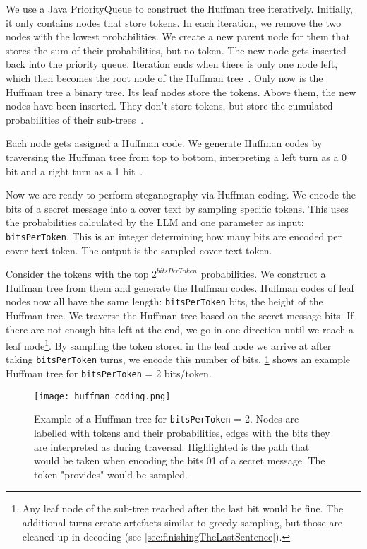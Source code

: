 We use a Java PriorityQueue to construct the Huffman tree iteratively. Initially, it only contains nodes that store tokens. In each iteration, we remove the two nodes with the lowest probabilities. We create a new parent node for them that stores the sum of their probabilities, but no token. The new node gets inserted back into the priority queue. Iteration ends when there is only one node left, which then becomes the root node of the Huffman tree~\cite{huffmanMethodConstructionMinimumRedundancy1952}. Only now is the Huffman tree a binary tree. Its leaf nodes store the tokens. Above them, the new nodes have been inserted. They don't store tokens, but store the cumulated probabilities of their sub-trees~\cite{huffmanMethodConstructionMinimumRedundancy1952}.

Each node gets assigned a Huffman code. We generate Huffman codes by traversing the Huffman tree from top to bottom, interpreting a left turn as a 0 bit and a right turn as a 1 bit~\cite{huffmanMethodConstructionMinimumRedundancy1952}.

Now we are ready to perform steganography via Huffman coding. We encode the bits of a secret message into a cover text by sampling specific tokens. This uses the probabilities calculated by the \gls{LLM} and one parameter as input: \lstinline|bitsPerToken|. This is an integer determining how many bits are encoded per cover text token. The output is the sampled cover text token.

Consider the tokens with the top $ 2^{bitsPerToken} $ probabilities. We construct a Huffman tree from them and generate the Huffman codes. Huffman codes of leaf nodes now all have the same length: \lstinline|bitsPerToken| bits, the height of the Huffman tree. We traverse the Huffman tree based on the secret message bits. If there are not enough bits left at the end, we go in one direction until we reach a leaf node\footnote{Any leaf node of the sub-tree reached after the last bit would be fine. The additional turns create artefacts similar to greedy sampling, but those are cleaned up in decoding (see \cref{sec:finishingTheLastSentence}).}. By sampling the token stored in the leaf node we arrive at after taking \lstinline|bitsPerToken| turns, we encode this number of bits. \cref{fig:huffmanCoding} shows an example Huffman tree for \lstinline|bitsPerToken| = 2 bits/token.

\begin{figure}
    \begin{wide}
        \centering
        \captionsetup{width=\linewidth}
        \texttt{[image: huffman\_coding.png]}
		\caption[Huffman coding]{Example of a Huffman tree for \lstinline|bitsPerToken| = 2. Nodes are labelled with tokens and their probabilities, edges with the bits they are interpreted as during traversal. Highlighted is the path that would be taken when encoding the bits 01 of a secret message. The token "provides" would be sampled.}
        \label{fig:huffmanCoding}
    \end{wide}
\end{figure}

